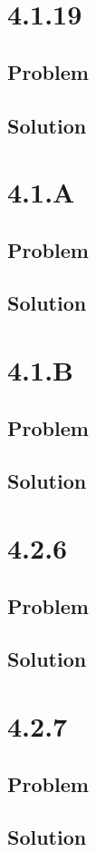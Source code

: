 \documentclass[12pt]{article}
\begin{document}
\section*{4.1.19}

\subsection*{Problem}

\subsection*{Solution}



\section*{4.1.A}

\subsection*{Problem}

\subsection*{Solution}



\section*{4.1.B}

\subsection*{Problem}

\subsection*{Solution}



\section*{4.2.6}

\subsection*{Problem}

\subsection*{Solution}



\section*{4.2.7}

\subsection*{Problem}

\subsection*{Solution}
\end{document}
